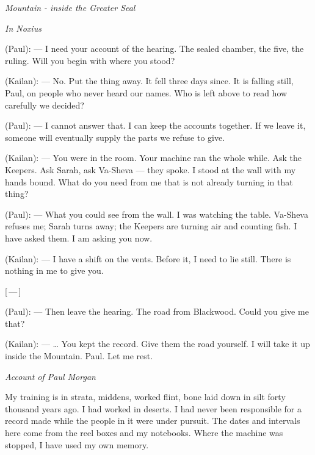 
\begin{center}\small\itshape Mountain - inside the Greater Seal\end{center}

\begin{room}

\textit{In Noxius}

(Paul): --- I need your account of the hearing. The sealed chamber, the five, the ruling. Will you begin with where you stood?

(Kailan): --- No. Put the thing away. It fell three days since. It is falling still, Paul, on people who never heard our names. Who is left above to read how carefully we decided?

(Paul): --- I cannot answer that. I can keep the accounts together. If we leave it, someone will eventually supply the parts we refuse to give.

(Kailan): --- You were in the room. Your machine ran the whole while. Ask the Keepers. Ask Sarah, ask Va-Sheva --- they spoke. I stood at the wall with my hands bound. What do you need from me that is not already turning in that thing?

(Paul): --- What you could see from the wall. I was watching the table. Va-Sheva refuses me; Sarah turns away; the Keepers are turning air and counting fish. I have asked them. I am asking you now.

(Kailan): --- I have a shift on the vents. Before it, I need to lie still. There is nothing in me to give you.

\centerline{[\,---\,]}

(Paul): --- Then leave the hearing. The road from Blackwood. Could you give me that?

(Kailan): --- \ldots{} You kept the record. Give them the road yourself. I will take it up inside the Mountain. Paul. Let me rest.

\end{room}

\begin{center}\small\itshape Account of Paul Morgan\end{center}

My training is in strata, middens, worked flint, bone laid down in silt forty thousand years ago. I had worked in deserts. I had never been responsible for a record made while the people in it were under pursuit. The dates and intervals here come from the reel boxes and my notebooks. Where the machine was stopped, I have used my own memory.\par

